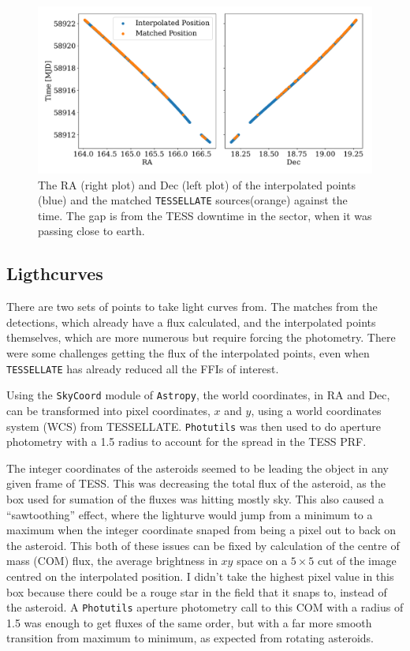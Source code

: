 \documentclass{UCreport}
\begin{document}
\begin{figure}[]
  \centering
  \includegraphics[width =\textwidth]{../Test Code/Testing Figures/DetectMatchPos.pdf}
  \caption[Interpolated and Detected Positions]{The RA (right plot) and Dec (left plot) of the interpolated points (blue) and the matched \texttt{TESSELLATE} sources(orange) against the time. The gap is from the TESS downtime in the sector, when it was passing close to earth.}
  \label{Fig:RADecMatch}
\end{figure}

\subsection{Ligthcurves}\label{SubSec:Lightcurves}

There are two sets of points to take light curves from.
The matches from the detections, which already have a flux calculated, and the interpolated points themselves, which are more numerous but require forcing the photometry.
There were some challenges getting the flux of the interpolated points, even when \texttt{TESSELLATE} has already reduced all the FFIs of interest.

Using the \texttt{SkyCoord} module of \texttt{Astropy}, the world coordinates, in RA and Dec, can be transformed into pixel coordinates, $x$ and $y$, using a world coordinates system (WCS) from TESSELLATE.
\texttt{Photutils} \citep{Bradley2024} was then used to do aperture photometry with a \qty{1.5}{\px} radius to account for the spread in the TESS PRF. %

The integer coordinates of the asteroids seemed to be leading the object in any given frame of TESS. %
This was decreasing the total flux of the asteroid, as the box used for sumation of the fluxes was hitting mostly sky.
This also caused a ``sawtoothing'' effect, where the lighturve would jump from a minimum to a maximum when the integer coordinate snaped from being a pixel out to back on the asteroid.
This both of these issues can be fixed by calculation of the centre of mass (COM) flux, the average brightness in $xy$ space on a $5\times5$ cut of the image centred on the interpolated position.
I didn't take the highest pixel value in this box because there could be a rouge star in the field that it snaps to, instead of the asteroid.
A \texttt{Photutils} aperture photometry call to this COM with a radius of \qty{1.5}{\px} was enough to get fluxes of the same order, but with a far more smooth transition from maximum to minimum, as expected from rotating asteroids.
\end{document}
